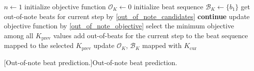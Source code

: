 \begin{algorithm}[ht!]
\begin{algorithmic}[1]
\State $n \gets 1$
    \State initialize objective function $\mathcal{O}_K\gets 0$
    \State initialize beat sequence $\mathcal{B}_K\gets \{b_1\}$
\EndFor
{}
        \State get out-of-note beats for current step by \eqref{out_of_note_candidates}
            \State \textbf{continue}
        \EndIf
            \State update objective function by \eqref{out_of_note_objective}
        \EndFor
        \State select the minimum objective among all $K_{\textrm{prev}}$ values
        \State add out-of-beats for the current step to the beat sequence mapped to the selected $K_{\textrm{prev}}$
    \EndFor
        \State update $\mathcal{O}_K$, $\mathcal{B}_K$ mapped with $K_{\textrm{cur}}$
    \EndFor
\EndFor
\State {}
\end{algorithmic}
[Out-of-note beat prediction.]{Out-of-note beat prediction.}
\end{algorithm}